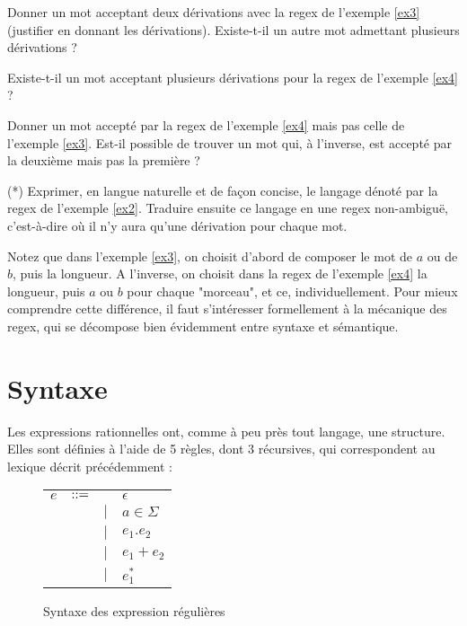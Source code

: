 \begin{exercice}
Donner un mot acceptant deux dérivations avec la regex de l'exemple \ref{ex3} (justifier en donnant les dérivations). Existe-t-il un autre mot admettant plusieurs dérivations ?
\end{exercice}

\begin{exercice}
Existe-t-il un mot acceptant plusieurs dérivations pour la regex de l'exemple \ref{ex4} ?
\end{exercice}

\begin{exercice}
Donner un mot accepté par la regex de l'exemple \ref{ex4} mais pas celle de l'exemple \ref{ex3}. Est-il possible de trouver un mot qui, à l'inverse, est accepté par la deuxième mais pas la première ?
\end{exercice}


\begin{exercice} (*)
Exprimer, en langue naturelle et de façon concise, le langage dénoté par la regex de l'exemple \ref{ex2}. Traduire ensuite ce langage en une regex non-ambiguë, c'est-à-dire où il n'y aura qu'une dérivation pour chaque mot.
\end{exercice}


Notez que dans l'exemple \ref{ex3}, on choisit d'abord de composer le mot de $a$ ou de $b$, puis la longueur. A l'inverse, on choisit dans la regex de l'exemple \ref{ex4} la longueur, puis $a$ ou $b$ pour chaque "morceau", et ce, individuellement. Pour mieux comprendre cette différence, il faut s'intéresser formellement à la mécanique des regex, qui se décompose bien évidemment entre syntaxe et sémantique.

\section{Syntaxe}


Les expressions rationnelles ont, comme à peu près tout langage, une structure. Elles sont définies à l'aide de 5 règles, dont 3 récursives, qui correspondent au lexique décrit précédemment : 

\begin{figure}[h]
    \centering
\begin{tabular}{cccl}
$e$ & $\textcolor{black}{::=}$ & & $\epsilon$\\
& & $|$&  $a \in \Sigma$\\
& & $|$&  $e_1.e_2$\\
& & $|$&  $e_1+e_2$\\
& & $|$&  $e_1^*$\\
\end{tabular}
\caption{Syntaxe des expression régulières}
    \label{resynfig}
\end{figure}


